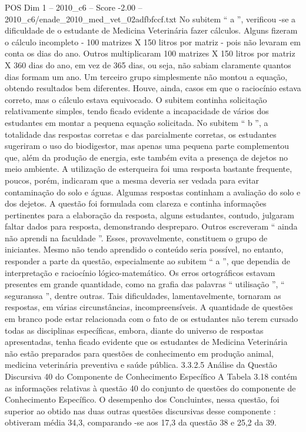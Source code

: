 \begin{textsample}{POS Dim 1 – 2010\_c6 – Score -2.00 – 2010\_c6/enade\_2010\_med\_vet\_02adfbfccf.txt}
No subitem “ a ”, verificou -se a dificuldade de o estudante de Medicina Veterinária fazer cálculos.
Alguns fizeram o cálculo incompleto - 100 matrizes X 150 litros por matriz - pois não levaram em conta os dias do ano.
Outros multiplicaram 100 matrizes X 150 litros por matriz X 360 dias do ano, em vez de 365 dias, ou seja, não sabiam claramente quantos dias formam um ano.
Um terceiro grupo simplesmente não montou a equação, obtendo resultados bem diferentes.
Houve, ainda, casos em que o raciocínio estava correto, mas o cálculo estava equivocado.
O subitem continha solicitação relativamente simples, tendo ficado evidente a incapacidade de vários dos estudantes em montar a pequena equação solicitada.
No subitem “ b ”, a totalidade das respostas corretas e das parcialmente corretas, os estudantes sugeriram o uso do biodigestor, mas apenas uma pequena parte complementou que, além da produção de energia, este também evita a presença de dejetos no meio ambiente.
A utilização de esterqueira foi uma resposta bastante frequente, poucos, porém, indicaram que a mesma deveria ser vedada para evitar contaminação do solo e águas.
Algumas respostas continham a avaliação do solo e dos dejetos.
A questão foi formulada com clareza e continha informações pertinentes para a elaboração da resposta, alguns estudantes, contudo, julgaram faltar dados para resposta, demonstrando despreparo.
Outros escreveram “ ainda não aprendi na faculdade ”.
Esses, provavelmente, constituem o grupo de iniciantes.
Mesmo não tendo aprendido o conteúdo seria possível, no entanto, responder a parte da questão, especialmente ao subitem “ a ”, que dependia de interpretação e raciocínio lógico-matemático.
Os erros ortográficos estavam presentes em grande quantidade, como na grafia das palavras “ utilisação ”, “ seguranssa ”, dentre outras.
Tais dificuldades, lamentavelmente, tornaram as respostas, em várias circunstâncias, incompreensíveis.
A quantidade de questões em branco pode estar relacionada com o fato de os estudantes não terem cursado todas as disciplinas específicas, embora, diante do universo de respostas apresentadas, tenha ficado evidente que os estudantes de Medicina Veterinária não estão preparados para questões de conhecimento em produção animal, medicina veterinária preventiva e saúde pública. 3.3.2.5 Análise da Questão Discursiva 40 do Componente de Conhecimento Específico A Tabela 3.18 contém as informações relativas à questão 40 do conjunto de questões do componente de Conhecimento Específico.
O desempenho dos Concluintes, nessa questão, foi superior ao obtido nas duas outras questões discursivas desse componente : obtiveram média 34,3, comparando -se aos 17,3 da questão 38 e 25,2 da 39.

\end{textsample}
